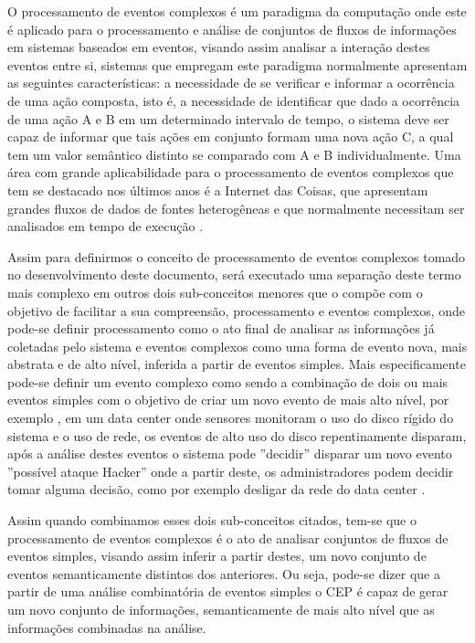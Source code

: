 \documentclass[ti,table]{texufpel} %
\begin{document}
O processamento de eventos complexos é um paradigma da computação onde este é aplicado para o processamento e análise de conjuntos de fluxos de informações em sistemas baseados em eventos, visando assim analisar a interação destes eventos entre si, sistemas que empregam este paradigma normalmente apresentam as seguintes características: a necessidade de se verificar e informar a ocorrência de uma ação composta, isto é, a necessidade de identificar que dado a ocorrência de uma ação A e B em um determinado intervalo de tempo, o sistema deve ser capaz de informar que tais ações em conjunto formam uma nova ação C, a qual tem um valor semântico distinto se comparado com A e B individualmente. Uma área com grande aplicabilidade para o processamento de eventos complexos que tem se destacado nos últimos anos é a Internet das Coisas, que apresentam grandes fluxos de dados de fontes heterogêneas e que normalmente necessitam ser analisados em tempo de execução \cite{jun2014design}.  

  

Assim para definirmos o conceito de processamento de eventos complexos tomado no desenvolvimento deste documento, será executado uma separação deste termo mais complexo em outros dois sub-conceitos menores que o compõe com o objetivo de facilitar a sua compreensão, processamento e eventos complexos, onde pode-se definir processamento como o ato final de analisar as informações já coletadas pelo sistema e eventos complexos como uma forma de evento nova, mais abstrata e de alto nível, inferida a partir de eventos simples. Mais especificamente pode-se definir um evento complexo como sendo a combinação de dois ou mais eventos simples com o objetivo de criar um novo evento de mais alto nível, por exemplo \cite{dayarathna2018recent}, em um data center onde sensores monitoram o uso do disco rígido do sistema e o uso de rede, os eventos de alto uso do disco repentinamente disparam, após a análise destes eventos o sistema pode ''decidir'' disparar um novo evento  ''possível ataque Hacker'' onde a partir deste, os administradores podem decidir tomar alguma decisão, como por exemplo desligar da rede do data center \cite{wu2006high}.  

  

Assim quando combinamos esses dois sub-conceitos citados, tem-se que o processamento de eventos complexos é o ato de analisar conjuntos de fluxos de eventos simples, visando assim inferir a partir destes, um novo conjunto de eventos semanticamente distintos dos anteriores. Ou seja, pode-se dizer que a partir de uma análise combinatória de eventos simples o CEP é capaz de gerar um novo conjunto de informações, semanticamente de mais alto nível que as informações combinadas na análise. 
\end{document}
